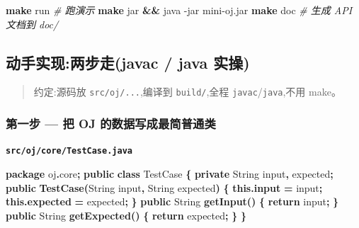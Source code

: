 \documentclass[
  11pt,
]{ctexart}
\newenvironment{Shaded}{\begin{snugshade}}{\end{snugshade}}
\newcommand{\AttributeTok}[1]{\textcolor[rgb]{0.13,0.29,0.53}{#1}}
\newcommand{\BuiltInTok}[1]{#1}
\newcommand{\CommentTok}[1]{\textcolor[rgb]{0.56,0.35,0.01}{\textit{#1}}}
\newcommand{\ControlFlowTok}[1]{\textcolor[rgb]{0.13,0.29,0.53}{\textbf{#1}}}
\newcommand{\ExtensionTok}[1]{#1}
\newcommand{\FunctionTok}[1]{\textcolor[rgb]{0.13,0.29,0.53}{\textbf{#1}}}
\newcommand{\ImportTok}[1]{#1}
\newcommand{\KeywordTok}[1]{\textcolor[rgb]{0.13,0.29,0.53}{\textbf{#1}}}
\newcommand{\NormalTok}[1]{#1}
\newcommand{\OperatorTok}[1]{\textcolor[rgb]{0.81,0.36,0.00}{\textbf{#1}}}
\begin{document}
\begin{Shaded}
\begin{Highlighting}[]
\FunctionTok{make}\NormalTok{ run          }\CommentTok{\# 跑演示}
\FunctionTok{make}\NormalTok{ jar }\KeywordTok{\&\&} \ExtensionTok{java} \AttributeTok{{-}jar}\NormalTok{ mini{-}oj.jar}
\FunctionTok{make}\NormalTok{ doc          }\CommentTok{\# 生成 API 文档到 doc/}
\end{Highlighting}
\end{Shaded}

\hypertarget{ux52a8ux624bux5b9eux73b0ux4e24ux6b65ux8d70javac-java-ux5b9eux64cd}{%
\subsection{动手实现:两步走(javac / java
实操)}\label{ux52a8ux624bux5b9eux73b0ux4e24ux6b65ux8d70javac-java-ux5b9eux64cd}}

\begin{quote}
约定:源码放 \texttt{src/oj/...},编译到 \texttt{build/},全程
\texttt{javac}/\texttt{java},不用 make。
\end{quote}

\hypertarget{ux7b2cux4e00ux6b65-ux628a-oj-ux7684ux6570ux636eux5199ux6210ux6700ux7b80ux666eux901aux7c7b}{%
\subsubsection{\texorpdfstring{第一步 \KS --- 把 OJ
的数据写成最简普通类}{第一步 --- 把 OJ 的数据写成最简普通类}}\label{ux7b2cux4e00ux6b65-ux628a-oj-ux7684ux6570ux636eux5199ux6210ux6700ux7b80ux666eux901aux7c7b}}

\textbf{\texttt{src/oj/core/TestCase.java}}

\begin{Shaded}
\begin{Highlighting}[]
\KeywordTok{package}\ImportTok{ oj}\OperatorTok{.}\ImportTok{core}\OperatorTok{;}
\KeywordTok{public} \KeywordTok{class}\NormalTok{ TestCase }\OperatorTok{\{}
    \KeywordTok{private} \BuiltInTok{String}\NormalTok{ input}\OperatorTok{,}\NormalTok{ expected}\OperatorTok{;}
    \KeywordTok{public} \FunctionTok{TestCase}\OperatorTok{(}\BuiltInTok{String}\NormalTok{ input}\OperatorTok{,} \BuiltInTok{String}\NormalTok{ expected}\OperatorTok{)} \OperatorTok{\{} \KeywordTok{this}\OperatorTok{.}\FunctionTok{input} \OperatorTok{=}\NormalTok{ input}\OperatorTok{;} \KeywordTok{this}\OperatorTok{.}\FunctionTok{expected} \OperatorTok{=}\NormalTok{ expected}\OperatorTok{;} \OperatorTok{\}}
    \KeywordTok{public} \BuiltInTok{String} \FunctionTok{getInput}\OperatorTok{()}    \OperatorTok{\{} \ControlFlowTok{return}\NormalTok{ input}\OperatorTok{;} \OperatorTok{\}}
    \KeywordTok{public} \BuiltInTok{String} \FunctionTok{getExpected}\OperatorTok{()} \OperatorTok{\{} \ControlFlowTok{return}\NormalTok{ expected}\OperatorTok{;} \OperatorTok{\}}
\OperatorTok{\}}
\end{Highlighting}
\end{Shaded}
\end{document}
